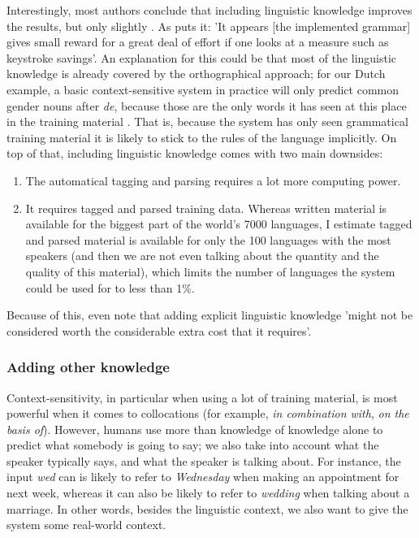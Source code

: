\documentclass[11pt]{article}
\begin{document}
Interestingly, most authors conclude that including linguistic knowledge improves the results, but only slightly . As  puts it: 'It appears [the implemented grammar] gives small reward for a great deal of effort if one looks at a measure such as keystroke savings'. An explanation for this could be that most of the linguistic knowledge is already covered by the orthographical approach; for our Dutch example, a basic context-sensitive system in practice will only predict common gender nouns after \emph{de}, because those are the only words it has seen at this place in the training material . That is, because the system has only seen grammatical training material it is likely to stick to the rules of the language implicitly. On top of that, including linguistic knowledge comes with two main downsides: 

\begin{enumerate}
\item The automatical tagging and parsing requires a lot more computing power.
\item It requires tagged and parsed training data. Whereas written material is available for the biggest part of the world's 7000 languages, I estimate tagged and parsed material is available for only the 100 languages with the most speakers (and then we are not even talking about the quantity and the quality of this material), which limits the number of languages the system could be used for to less than 1\%.
\end{enumerate}

Because of this,  even note that adding explicit linguistic knowledge 'might not be considered worth the considerable extra cost that it requires'.

\subsubsection{Adding other knowledge} \label{more_knowledge}

Context-sensitivity, in particular when using a lot of training material, is most powerful when it comes to collocations (for example, \emph{in combination with}, \emph{on the basis of}). However, humans use more than knowledge of knowledge alone to predict what somebody is going to say; we also take into account what the speaker typically says, and what the speaker is talking about. For instance, the input \emph{wed} can is likely to refer to \emph{Wednesday} when making an appointment for next week, whereas it can also be likely to refer to \emph{wedding} when talking about a marriage. In other words, besides the linguistic context, we also want to give the system some real-world context.
\end{document}
